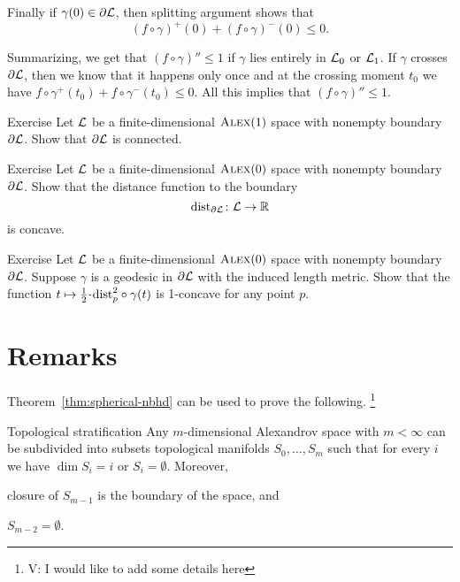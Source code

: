 Finally if $\gamma(0)\in\partial\mathcal{L}$, then splitting argument shows that 
\[(f\circ\gamma)^+(0)+(f\circ\gamma)^-(0)\le 0.\]

Summarizing, we get that $(f\circ\gamma)''\le 1$ if $\gamma$ lies entirely in $\mathcal{L}_0$ or $\mathcal{L}_1$.
If $\gamma$ crosses $\partial \mathcal{L}$, then we know that it happens only once and at the crossing moment $t_0$ 
we have $f\circ\gamma^+(t_0)+f\circ\gamma^-(t_0)\le 0$.
All this implies that $(f\circ\gamma)''\le 1$.
\qeds

\begin{thm}{Exercise}\label{ex:bry-connected}
Let $\mathcal{L}$ be a finite-dimensional $\textsc{Alex}(1)$ space with nonempty boundary $\partial\mathcal{L}$.
Show that $\partial\mathcal{L}$ is connected.
\end{thm}


\begin{thm}{Exercise}\label{ex:dist-to-bry}
Let $\mathcal{L}$ be a finite-dimensional $\textsc{Alex}(0)$ space with nonempty boundary $\partial\mathcal{L}$.
Show that the distance function to the boundary
\[\mathrm{dist}_{\partial\mathcal{L}}\colon\mathcal{L}\to\mathbb{R}\]
is concave.
\end{thm}

\begin{thm}{Exercise}\label{ex:liberman}
Let $\mathcal{L}$ be a finite-dimensional $\textsc{Alex}(0)$ space with nonempty boundary $\partial\mathcal{L}$.
Suppose $\gamma$ is a geodesic in $\partial\mathcal{L}$ with the induced length metric.
Show that the function $t\mapsto \tfrac12\cdot\distfun_p^2\circ\gamma(t)$ is 1-concave for any point $p$. 
\end{thm}

\section{Remarks}

Theorem~\ref{thm:spherical-nbhd} can be used to prove the following. \footnote{\red V:  I would like to add some details here}

\begin{thm}{Topological stratification}\label{thm:top-stratification}
Any $m$-dimensional Alexandrov space with $m<\infty$ can be subdivided into subsets topological manifolds $S_0,\dots,S_m$ such that for every $i$ we have $\dim S_i=i$ or $S_i=\emptyset$.
Moreover,
\begin{subthm}{}
closure of $S_{m-1}$ is the boundary of the space, and
\end{subthm}

\begin{subthm}{}
$S_{m-2}=\emptyset$.
\end{subthm}

\end{thm}

